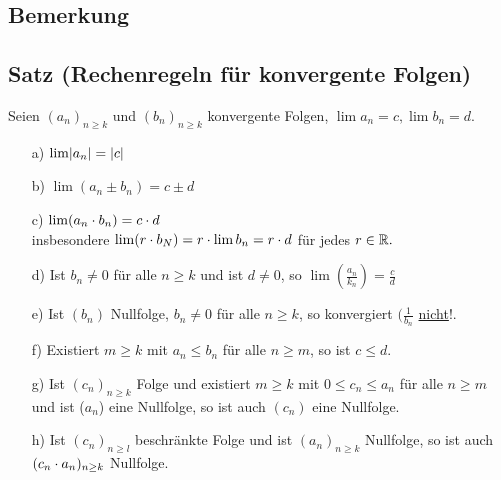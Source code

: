 \subsection{Bemerkung}
\begin{enumerate}
\item[a)]$(a_n)_{n \geq 1}$ Nullfolge $\Leftrightarrow (\abs{a_n})_{n \geq 1}$ Nullfolge ($\abs{a_n - 0} = \abs{a_n} - \abs{\abs{a_n}-0}}$
\item[b)]$\lim_{n\Rightarrow\infty} a_n = c \Leftrightarrow (a_n -c)_{n \geq k}$ ist Nullfolge $\Leftrightarrow (\abs{a_n -c})_{n \geq k}$ ist Nullfolge
\end{enumerate}
\subsection{Satz (Rechenregeln f\"ur konvergente Folgen)}
Seien $(a_n)_{n \geq k}$ und $(b_n)_{n \geq k}$ konvergente Folgen, $\lim a_n = c, \lim b_n = d.$\\
\begin{enumerate}
\item[a)]$\lim \abs{a_n} = \abs{c}$
\item[b)]$\lim (a_n \pm b_n) = c \pm d$
\item[c)]$\lim (a_n \cd b_n) = c \cd d$\\
insbesondere $\lim(r \cd b_N) = r \cd \lim b_n = r \cd d$ f\"ur jedes $r \in \R.$
\item[d)]Ist $b_n \not = 0$ f\"ur alle $n \geq k$ und ist $ d \not = 0$, so $\lim (\frac{a_n}{k_n}) = \frac{c}{d}$
\item[e)]Ist $(b_n)$ Nullfolge, $b_n \not = 0$ f\"ur alle $n \geq k$, so konvergiert $(\frac{1}{b_n}$ \underline{nicht}!.
\item[f)]Existiert $m \geq k$ mit $a_n \leq b_n$ f\"ur alle $n \geq m$, so ist $c \leq d$.
\item[g)] Ist $(c_n)_{n \geq k}$ Folge und existiert $ m \geq k$ mit $0 \leq c_n \leq a_n$ f\"ur alle $n \geq m$ und ist ($a_n$) eine Nullfolge, so ist auch $(c_n)$ eine Nullfolge.
\item[h)]Ist $(c_n)_{n \geq l}$ beschr\"ankte Folge und ist $(a_n)_{n \geq k}$ Nullfolge, so ist auch $(c_n \cd a_n)_{n \geq k}$ Nullfolge.\\
\end{enumerate}
